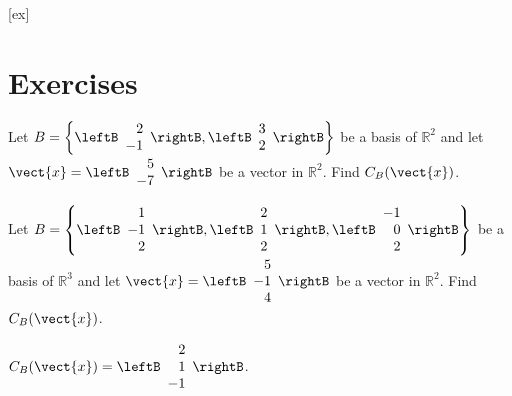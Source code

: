 [ex]
\section*{Exercises}

\begin{enumialphparenastyle}

\begin{ex}
Let $B = \left\{ \leftB \begin{array}{r}
2 \\
-1 
\end{array} \rightB, \leftB \begin{array}{r}
3 \\
2
\end{array} \rightB \right\}$ be a basis of $\mathbb{R}^2$ and let $\vect{x} = \leftB
\begin{array}{r}
5 \\
-7
\end{array}
\rightB$ be a vector in $\mathbb{R}^2$. Find $C_B(\vect{x})$. 
\end{ex}

\begin{ex}
Let $B = \left\{ \leftB \begin{array}{r}
1 \\
-1 \\
2 
\end{array} \rightB, \leftB \begin{array}{r}
2 \\
1 \\
2
 \end{array} \rightB, \leftB \begin{array}{r}
-1 \\
0 \\
2
\end{array} \rightB \right\}$ 
be a basis of $\mathbb{R}^3$ and let $\vect{x} = \leftB
\begin{array}{r}
5 \\
-1 \\
4
\end{array}
\rightB$ be a vector in $\mathbb{R}^2$. Find $C_B(\vect{x})$. 
\begin{sol}
 $C_B(\vect{x}) = 
\leftB \begin{array}{r}
2 \\
1 \\
-1
 \end{array} \rightB $.
\end{sol}
\end{ex}



\end{enumialphparenastyle}
